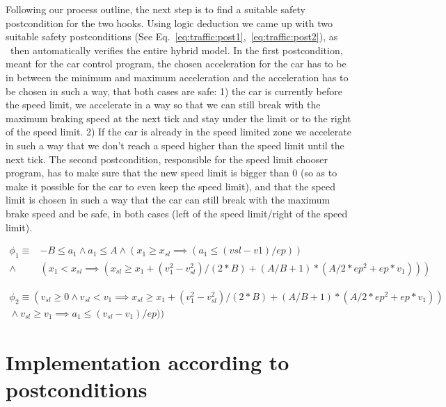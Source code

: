 Following our process outline, the next step is to find a suitable safety postcondition for the two hooks. Using logic deduction we came up with two suitable safety postconditions (See Eq.~\ref{eq:traffic:post1},~\ref{eq:traffic:post2}), as \keym~then automatically verifies the entire hybrid model. In the first postcondition, meant for the car control program, the chosen acceleration for the car has to be in between the minimum and maximum acceleration and the acceleration has to be chosen in such a way, that both cases are safe: 1) the car is currently before the speed limit, we accelerate in a way so that we can still break with the maximum braking speed at the next tick and stay under the limit or to the right of the speed limit. 2) If the car is already in the speed limited zone we accelerate in such a way that we don't reach a speed higher than the speed limit until the next tick. The second postcondition, responsible for the speed limit chooser program, has to make sure that the new speed limit is bigger than 0 (so as to make it possible for the car to even keep the speed limit), and that the speed limit is chosen in such a way that the car can still break with the maximum brake speed and be safe, in both cases (left of the speed limit/right of the speed limit).

\begin{equation}
\begin{split}
	\phi_1 \equiv&-B \leq a_1 \wedge a_1 \leq A \wedge (x_1 \geq x_{sl} \implies (a_1 \leq (vsl - v1) / ep)) \\
	 {}\wedge{}& (x_1 < x_{sl} \implies (x_{sl} \geq x_1 + (v_1^2 - v_{sl}^2) / (2 * B) + (A / B + 1) * (A / 2 * ep^2 + ep * v_1)))
	\end{split}
	\label{eq:traffic:post1}
\end{equation}
	
	
\begin{equation}
\begin{split}
	\phi_2\equiv (v_{sl} \geq 0 \wedge v_{sl} < v_1 \implies{}   x_{sl} \geq x_1 + (v_1^{2} - v_{sl} ^{2}) / (2*B) + (A/B + 1) *  (A / 2 * ep^2 + ep * v_1)) \\
	{}\wedge  v_{sl} \geq v_1 \implies a_1 \leq (v_{sl} - v_1) / ep))
\end{split}
	\label{eq:traffic:post2}
\end{equation}

\section{Implementation according to postconditions}
\label{sec:traffic:impl}

